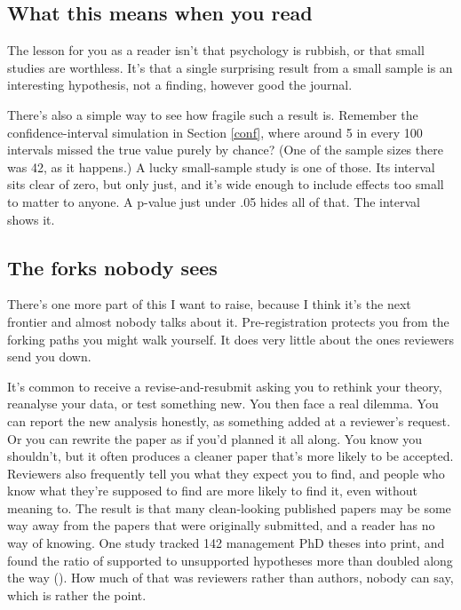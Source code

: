 \documentclass[
]{book}
\begin{document}
\subsection{What this means when you read}\label{what-this-means-when-you-read}

The lesson for you as a reader isn't that psychology is rubbish, or that small studies are worthless. It's that a single surprising result from a small sample is an interesting hypothesis, not a finding, however good the journal.

There's also a simple way to see how fragile such a result is. Remember the confidence-interval simulation in Section \ref{conf}, where around 5 in every 100 intervals missed the true value purely by chance? (One of the sample sizes there was 42, as it happens.) A lucky small-sample study is one of those. Its interval sits clear of zero, but only just, and it's wide enough to include effects too small to matter to anyone. A p-value just under .05 hides all of that. The interval shows it.

\subsection{The forks nobody sees}\label{the-forks-nobody-sees}

There's one more part of this I want to raise, because I think it's the next frontier and almost nobody talks about it. Pre-registration protects you from the forking paths you might walk yourself. It does very little about the ones reviewers send you down.

It's common to receive a revise-and-resubmit asking you to rethink your theory, reanalyse your data, or test something new. You then face a real dilemma. You can report the new analysis honestly, as something added at a reviewer's request. Or you can rewrite the paper as if you'd planned it all along. You know you shouldn't, but it often produces a cleaner paper that's more likely to be accepted. Reviewers also frequently tell you what they expect you to find, and people who know what they're supposed to find are more likely to find it, even without meaning to. The result is that many clean-looking published papers may be some way away from the papers that were originally submitted, and a reader has no way of knowing. One study tracked 142 management PhD theses into print, and found the ratio of supported to unsupported hypotheses more than doubled along the way (). How much of that was reviewers rather than authors, nobody can say, which is rather the point.
\end{document}
